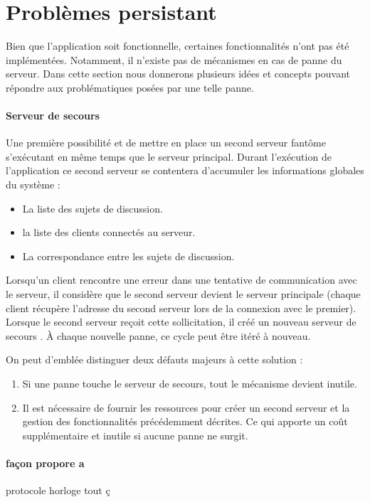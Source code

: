 \documentclass[12pt]{article}
\begin{document}
\section{Problèmes persistant}\label{sec:pblm}
Bien que l'application soit fonctionnelle, certaines fonctionnalités n'ont pas été implémentées. Notamment, il n'existe pas de mécanismes en cas de panne du serveur. Dans cette section nous donnerons plusieurs idées et concepts pouvant répondre aux problématiques posées par une telle panne.


\paragraph{Serveur de secours}
Une première possibilité et de mettre en place un second serveur \og fantôme \fg{} s'exécutant en même temps que le serveur principal. Durant l'exécution de l'application ce second serveur se contentera d'accumuler les informations globales du système : 
\begin{itemize}
\item
  La liste des sujets de discussion.
\item
  la liste des clients connectés au serveur.
\item
  La correspondance entre les sujets de discussion.
\end{itemize}
Lorsqu'un client rencontre une erreur dans une tentative de communication avec le serveur, il considère que le second serveur devient le serveur principale (chaque client récupère l'adresse du second serveur lors de la connexion avec le premier). Lorsque le second serveur reçoit cette sollicitation, il créé un nouveau  \og serveur de secours \fg{}. À chaque nouvelle panne, ce cycle peut être itéré à nouveau.

On peut d'emblée distinguer deux défauts majeurs à cette solution : 

\begin{enumerate}
\item
  Si une panne touche le serveur de secours, tout le mécanisme devient inutile.
\item
  Il est nécessaire de fournir les ressources pour créer un second serveur et la gestion des fonctionnalités précédemment décrites. Ce qui apporte un coût supplémentaire et inutile si aucune panne ne surgit.
\end{enumerate}


\paragraph{façon propore a}

protocole horloge tout ç  
\end{document}
